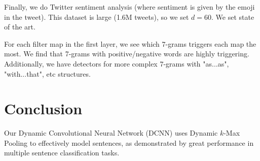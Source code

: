 \documentclass[a4paper]{article}
\begin{document}
Finally, we do Twitter sentiment analysis (where sentiment is given by the
emoji in the tweet). This dataset is large (1.6M tweets), so we set $d = 60$. We
set state of the art.

For each filter map in the first layer, we see which 7-grams triggers each
map the most. We find that 7-grams with positive/negative words are highly
triggering. Additionally, we have detectors for more complex 7-grams with
"as...as", "with...that", etc structures.

\section{Conclusion}
Our Dynamic Convolutional Neural Network (DCNN) uses Dynamic $k$-Max Pooling
to effectively model sentences, as demonstrated by great performance in
multiple sentence classification tasks.
\end{document}

